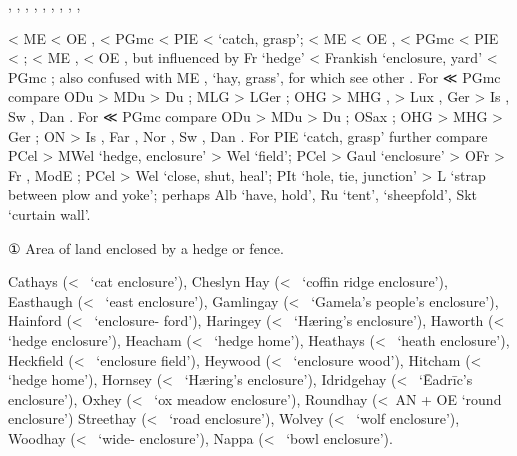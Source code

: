\documentclass[12pt,letterpaper,oneside,article,draft]{memoir}
\begin{document}
\begin{Lemma}
\begin{Also}
	, , , , , , , , , 
\end{Also}
\begin{Etymology}
	 < ME  < OE ,  < PGmc  < PIE 
		<  ‘catch, grasp’;
	 < ME  < OE ,  < PGmc  < PIE 
		< ;
	 < ME ,  < OE ,  but influenced by Fr  ‘hedge’
		< Frankish  ‘enclosure, yard’ < PGmc ;
	also confused with ME ,  ‘hay, grass’, for which see other .
	For  ≪ PGmc  compare
		ODu  > MDu  > Du ;
		MLG  > LGer ;
		OHG  > MHG ,  > Lux ,
			Ger  > Is , Sw , Dan .
	For  ≪ PGmc  compare
		ODu  > MDu  > Du ;
		OSax ;
		OHG  > MHG  > Ger ;
		ON  > Is , Far , Nor , Sw , Dan .	
	For PIE  ‘catch, grasp’ further compare
		PCel  > MWel  ‘hedge, enclosure’ > Wel  ‘field’; 
		PCel  > Gaul  ‘enclosure’ > OFr  > Fr , ModE ;
		PCel  > Wel  ‘close, shut, heal’;
		PIt  ‘hole, tie, junction’ > L  ‘strap between plow and yoke’;
		perhaps
		Alb  ‘have, hold’,
		Ru   ‘tent’,   ‘sheepfold’,
		Skt   ‘curtain wall’.
\end{Etymology}
\begin{Definitions}
	① Area of land enclosed by a hedge or fence.
\end{Definitions}
\begin{Examples}
	Cathays (<~ ‘cat enclosure’), Cheslyn Hay (<~ ‘coffin ridge enclosure’), Easthaugh (<~ ‘east enclosure’), Gamlingay (<~ ‘Gamela’s people’s enclosure’), Hainford (<~ ‘enclosure- ford’), Haringey (<~ ‘Hæring’s enclosure’), Haworth (<~ ‘hedge enclosure’), Heacham (<~ ‘hedge home’), Heathays (<~ ‘heath enclosure’), Heckfield (<~ ‘enclosure field’), Heywood (<~ ‘enclosure wood’), Hitcham (<~ ‘hedge home’), Hornsey (<~ ‘Hæring’s enclosure’), Idridgehay (<~ ‘Ēadrīc’s enclosure’), Oxhey (<~ ‘ox meadow enclosure’), Roundhay (<~AN  + OE  ‘round enclosure’) Streethay (<~ ‘road enclosure’), Wolvey (<~ ‘wolf enclosure’), Woodhay (<~ ‘wide- enclosure’), Nappa (<~ ‘bowl enclosure’).
\end{Examples}
\end{Lemma}
\end{document}
